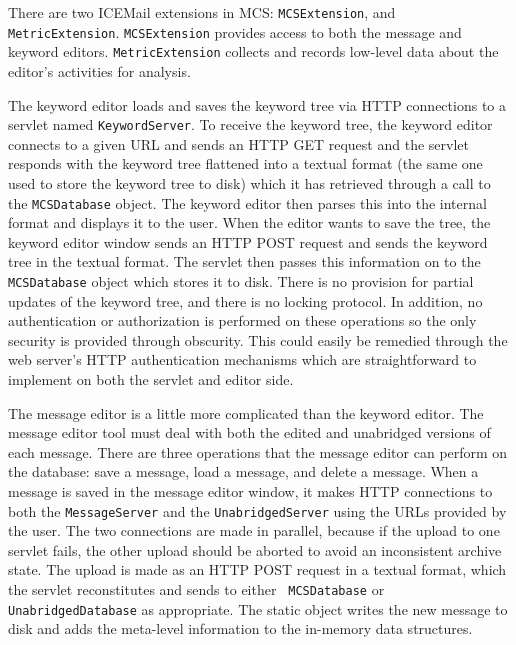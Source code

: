 There are two ICEMail extensions in MCS: {\tt MCSExtension}, and {\tt
  MetricExtension}. {\tt MCSExtension} provides access to both the message and
keyword editors. {\tt MetricExtension} collects and records low-level data
about the editor's activities for analysis.

The keyword editor loads and saves the keyword tree via HTTP connections to a
servlet named {\tt KeywordServer}. To receive the keyword tree, the keyword
editor connects to a given URL and sends an HTTP GET request and the servlet
responds with the keyword tree flattened into a textual format (the same one
used to store the keyword tree to disk) which it has retrieved through a call
to the {\tt MCSDatabase} object. The keyword editor then parses this into the
internal format and displays it to the user. When the editor wants to save the
tree, the keyword editor window sends an HTTP POST request and sends the
keyword tree in the textual format. The servlet then passes this information on
to the {\tt MCSDatabase} object which stores it to disk. There is no provision
for partial updates of the keyword tree, and there is no locking protocol. In
addition, no authentication or authorization is performed on these operations
so the only security is provided through obscurity. This could easily be
remedied through the web server's HTTP authentication mechanisms which are
straightforward to implement on both the servlet and editor side.

The message editor is a little more complicated than the keyword editor. The
message editor tool must deal with both the edited and unabridged versions of
each message. There are three operations that the message editor can perform on
the database: save a message, load a message, and delete a message.  When a
message is saved in the message editor window, it makes HTTP connections to
both the {\tt MessageServer} and the {\tt UnabridgedServer} using the URLs
provided by the user. The two connections are made in parallel, because if the
upload to one servlet fails, the other upload should be aborted to avoid an
inconsistent archive state. The upload is made as an HTTP POST request in a
textual format, which the servlet reconstitutes and sends to either {\tt
  MCSDatabase} or {\tt UnabridgedDatabase} as appropriate. The static object
writes the new message to disk and adds the meta-level information to the
in-memory data structures.

